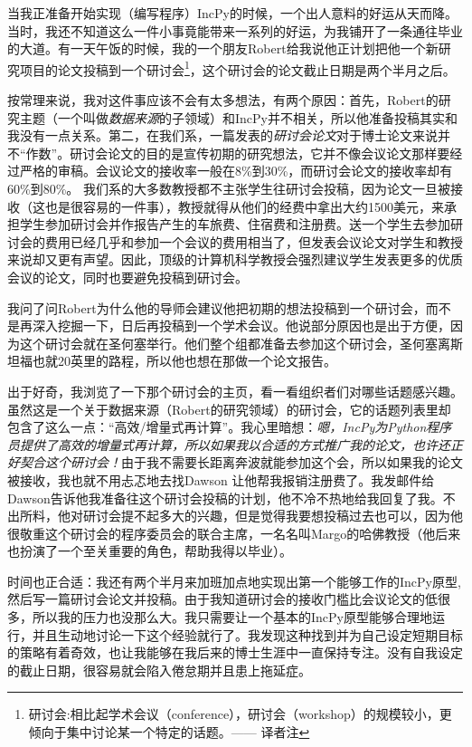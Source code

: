 \documentclass[letter,12pt]{book}
\begin{document}
\begin{CJK}{UTF8}{gbsn}
当我正准备开始实现（编写程序）IncPy的时候，一个出人意料的好运从天而降。当时，我还不知道这么一件小事竟能带来一系列的好运，为我铺开了一条通往毕业的大道。有一天午饭的时候，我的一个朋友Robert给我说他正计划把他一个新研究项目的论文投稿到一个研讨会\footnote{研讨会:相比起学术会议（conference），研讨会（workshop）的规模较小，更倾向于集中讨论某一个特定的话题。—— 译者注}，这个研讨会的论文截止日期是两个半月之后。

按常理来说，我对这件事应该不会有太多想法，有两个原因：首先，Robert的研究主题（一个叫做\emph{数据来源}的子领域）和IncPy并不相关，所以他准备投稿其实和我没有一点关系。第二，在我们系，一篇发表的\emph{研讨会论文}对于博士论文来说并不“作数”。研讨会论文的目的是宣传初期的研究想法，它并不像会议论文那样要经过严格的审稿。会议论文的接收率一般在8\%到30\%，而研讨会论文的接收率却有60\%到80\%。 我们系的大多数教授都不主张学生往研讨会投稿，因为论文一旦被接收（这也是很容易的一件事），教授就得从他们的经费中拿出大约1500美元，来承担学生参加研讨会并作报告产生的车旅费、住宿费和注册费。送一个学生去参加研讨会的费用已经几乎和参加一个会议的费用相当了，但发表会议论文对学生和教授来说却又更有声望。因此，顶级的计算机科学教授会强烈建议学生发表更多的优质会议的论文，同时也要避免投稿到研讨会。

我问了问Robert为什么他的导师会建议他把初期的想法投稿到一个研讨会，而不是再深入挖掘一下，日后再投稿到一个学术会议。他说部分原因也是出于方便，因为这个研讨会就在圣何塞举行。他们整个组都准备去参加这个研讨会，圣何塞离斯坦福也就20英里的路程，所以他也想在那做一个论文报告。

出于好奇，我浏览了一下那个研讨会的主页，看一看组织者们对哪些话题感兴趣。虽然这是一个关于数据来源（Robert的研究领域）的研讨会，它的话题列表里却包含了这么一点：“高效/增量式再计算”。我心里暗想：\emph{嗯，IncPy为Python程序员提供了高效的增量式再计算，所以如果我以合适的方式推广我的论文，也许还正好契合这个研讨会！}由于我不需要长距离奔波就能参加这个会，所以如果我的论文被接收，我也就不用忐忑地去找Dawson 让他帮我报销注册费了。我发邮件给Dawson告诉他我准备往这个研讨会投稿的计划，他不冷不热地给我回复了我。不出所料，他对研讨会提不起多大的兴趣，但是觉得我要想投稿过去也可以，因为他很敬重这个研讨会的程序委员会的联合主席，一名名叫Margo的哈佛教授（他后来也扮演了一个至关重要的角色，帮助我得以毕业）。

时间也正合适：我还有两个半月来加班加点地实现出第一个能够工作的IncPy原型,然后写一篇研讨会论文并投稿。由于我知道研讨会的接收门槛比会议论文的低很多，所以我的压力也没那么大。我只需要让一个基本的IncPy原型能够合理地运行，并且生动地讨论一下这个经验就行了。我发现这种找到并为自己设定短期目标的策略有着奇效，也让我能够在我后来的博士生涯中一直保持专注。没有自我设定的截止日期，很容易就会陷入倦怠期并且患上拖延症。


\end{CJK}
\end{document}

